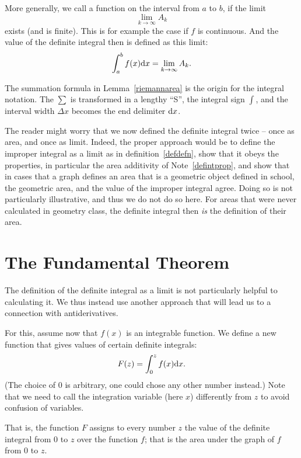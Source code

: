 \begin{defn}
\label{defdefn}
More generally, we call a function  on the interval from
$a$ to $b$, if the limit
\[
\lim_{k\to\infty} A_k
\]
exists (and is finite). This is for example the case if $f$ is continuous.
And the value of the definite integral then is defined as this limit:
\[
\int_a^b f(x){\mbox{d}}x=\lim_{k\to\infty} A_k.
\]
\end{defn}
\begin{note}
The summation formula in Lemma~\ref{riemannarea} is the origin for the integral
notation. The $\sum$ is transformed in a lengthy ``S'', the integral sign
$\int$, and the interval width $\Delta x$ becomes the end delimiter
${\mbox{d}}x$.
\end{note}

\begin{note}
The reader might worry that we now defined the definite integral twice -- once as
area, and once as limit. Indeed, the proper approach would be to define the
improper integral as a limit as in definition~\ref{defdefn}, show that it obeys
the properties, in particular the area additivity of Note~\ref{defintprop}, and
show that in cases that a graph defines an area that is a geometric object defined
in school, the geometric area, and the value of the improper integral agree. Doing
so is not particularly illustrative, and thus we do not do so here.
For areas that were never calculated in geometry class, the definite integral then
{\em is} the definition of their area.
\end{note}

\section{The Fundamental Theorem}

The definition of the definite integral as a limit is not particularly helpful to
calculating it. We thus instead use another approach that will lead us to a
connection with antiderivatives.

For this, assume now that $f(x)$ is an integrable function.
We define a new function that gives values of certain definite integrals:
\[
F(z)=\int_0^z f(x){\mbox{d}}x.
\]
(The choice of $0$ is arbitrary, one could chose any other number instead.)
Note that we need to call the integration variable (here $x$) differently from $z$
to avoid confusion of variables.

That is, the function $F$ assigns to every number $z$ the value of the definite
integral from $0$ to $z$ over the function $f$; that is the area under the graph
of $f$ from $0$ to $z$.

